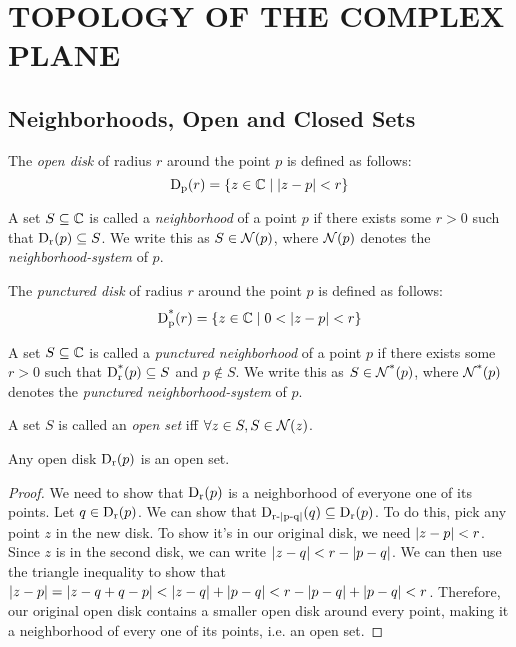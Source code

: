 \section{TOPOLOGY OF THE COMPLEX PLANE}
\subsection{Neighborhoods, Open and Closed Sets}
\begin{definition}
The \emph{open disk} of radius $r$ around the point $p$ is defined as follows:
\begin{equation*}\disk{r}{p} = \{z \in \C \mid \modulus{z-p} < r\}\end{equation*}
\end{definition}
\begin{definition}
A set $S \subseteq \C$ is called a \emph{neighborhood} of a point $p$ if there exists some $r > 0$ such that $\disk{p}{r} \subseteq S$.
We write this as $S \in \nbhd{p}$, where $\nbhd{p}$ denotes the \emph{neighborhood-system} of $p$.
\end{definition}
\begin{definition}
The \emph{punctured disk} of radius $r$ around the point $p$ is defined as follows:
\begin{equation*}\pdisk{r}{p} = \{z \in \C \mid 0<\modulus{z-p} < r\}\end{equation*}
\end{definition}
\begin{definition}
A set $S \subseteq \C$ is called a \emph{punctured neighborhood} of a point $p$ if there exists some $r > 0$ such that $\pdisk{p}{r} \subseteq S$ and $p \notin S$.
We write this as $S \in \pnbhd{p}$, where $\pnbhd{p}$ denotes the \emph{punctured neighborhood-system} of $p$.
\end{definition}
\begin{definition}
A set $S$ is called an \emph{open set} iff $\forall z \in S, S \in \nbhd{z}$.
\end{definition}
\begin{lemma}
Any open disk $\disk{p}{r}$ is an open set.
\end{lemma}
\begin{proof}
We need to show that $\disk{p}{r}$ is a neighborhood of everyone one of its points. Let $q \in \disk{p}{r}$. We can show that $\disk{q}{r-\modulus{p-q}} \subseteq \disk{p}{r}$. To do this, pick any point $z$ in the new disk. To show it's in our original disk, we need $\modulus{z-p} < r$. Since $z$ is in the second disk, we can write $\modulus{z-q} < r-\modulus{p-q}$. We can then use the triangle inequality to show that $\modulus{z-p} = \modulus{z-q+q-p} < \modulus{z-q}+\modulus{p-q} < r-\modulus{p-q}+\modulus{p-q} < r$. Therefore, our original open disk contains a smaller open disk around every point, making it a neighborhood of every one of its points, i.e. an open set.
\end{proof}
